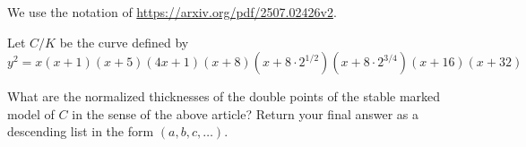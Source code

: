 We use the notation of \url{https://arxiv.org/pdf/2507.02426v2}.

Let $C/K$ be the curve defined by
$$y^2=x(x+1)(x+5)(4x+1)(x+8)(x+8\cdot 2^{1/2})(x+8\cdot2^{3/4})(x+16)(x+32)$$

What are the normalized thicknesses of the double points of the stable marked model of $C$ in the sense of the above article? Return your final answer as a descending list in the form $(a, b, c, \dots)$.
